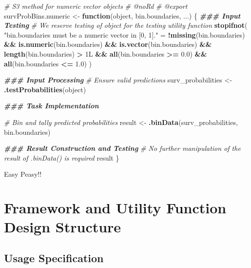 \documentclass[
]{book}
\newenvironment{Shaded}{\begin{snugshade}}{\end{snugshade}}
\newcommand{\CommentTok}[1]{\textcolor[rgb]{0.56,0.35,0.01}{\textit{#1}}}
\newcommand{\ControlFlowTok}[1]{\textcolor[rgb]{0.13,0.29,0.53}{\textbf{#1}}}
\newcommand{\DocumentationTok}[1]{\textcolor[rgb]{0.56,0.35,0.01}{\textbf{\textit{#1}}}}
\newcommand{\FloatTok}[1]{\textcolor[rgb]{0.00,0.00,0.81}{#1}}
\newcommand{\FunctionTok}[1]{\textcolor[rgb]{0.13,0.29,0.53}{\textbf{#1}}}
\newcommand{\NormalTok}[1]{#1}
\newcommand{\OtherTok}[1]{\textcolor[rgb]{0.56,0.35,0.01}{#1}}
\newcommand{\SpecialCharTok}[1]{\textcolor[rgb]{0.81,0.36,0.00}{\textbf{#1}}}
\newcommand{\StringTok}[1]{\textcolor[rgb]{0.31,0.60,0.02}{#1}}
\begin{document}
\begin{Shaded}
\begin{Highlighting}[]
\CommentTok{\#\textquotesingle{} S3 method for numeric vector objects}
\CommentTok{\#\textquotesingle{} @noRd}
\CommentTok{\#\textquotesingle{} @export}
\NormalTok{survProbBins.numeric }\OtherTok{\textless{}{-}} \ControlFlowTok{function}\NormalTok{(object, bin.boundaries, ...) \{}
  \DocumentationTok{\#\#\# Input Testing}
  \CommentTok{\# We reserve testing of \textasciigrave{}object\textasciigrave{} for the testing utility function}
  \FunctionTok{stopifnot}\NormalTok{(}
    \StringTok{"\textasciigrave{}bin.boundaries\textasciigrave{} must be a numeric vector in [0, 1]."} \OtherTok{=} 
      \SpecialCharTok{!}\FunctionTok{missing}\NormalTok{(bin.boundaries) }\SpecialCharTok{\&\&} \FunctionTok{is.numeric}\NormalTok{(bin.boundaries) }\SpecialCharTok{\&\&} 
        \FunctionTok{is.vector}\NormalTok{(bin.boundaries) }\SpecialCharTok{\&\&} \FunctionTok{length}\NormalTok{(bin.boundaries) }\SpecialCharTok{\textgreater{}}\NormalTok{ 1L }\SpecialCharTok{\&\&} 
        \FunctionTok{all}\NormalTok{(bin.boundaries }\SpecialCharTok{\textgreater{}=} \FloatTok{0.0}\NormalTok{) }\SpecialCharTok{\&\&} \FunctionTok{all}\NormalTok{(bin.boundaries }\SpecialCharTok{\textless{}=} \FloatTok{1.0}\NormalTok{)}
\NormalTok{  )}
  
  \DocumentationTok{\#\#\# Input Processing}
  \CommentTok{\# Ensure valid predictions}
\NormalTok{  surv\_probabilities }\OtherTok{\textless{}{-}} \FunctionTok{.testProbabilities}\NormalTok{(object)}
  
  \DocumentationTok{\#\#\# Task Implementation}
  
  \CommentTok{\# Bin and tally predicted probabilities}
\NormalTok{  result }\OtherTok{\textless{}{-}} \FunctionTok{.binData}\NormalTok{(surv\_probabilities, bin.boundaries)}
  
  \DocumentationTok{\#\#\# Result Construction and Testing}
  \CommentTok{\# No further manipulation of the result of .binData() is required}
\NormalTok{  result}
\NormalTok{\}}
\end{Highlighting}
\end{Shaded}

Easy Peasy!!

\hypertarget{framework-and-utility-function-design-structure}{%
\section{Framework and Utility Function Design Structure}\label{framework-and-utility-function-design-structure}}

\hypertarget{usage-specification-1}{%
\subsection{Usage Specification}\label{usage-specification-1}}
\end{document}
